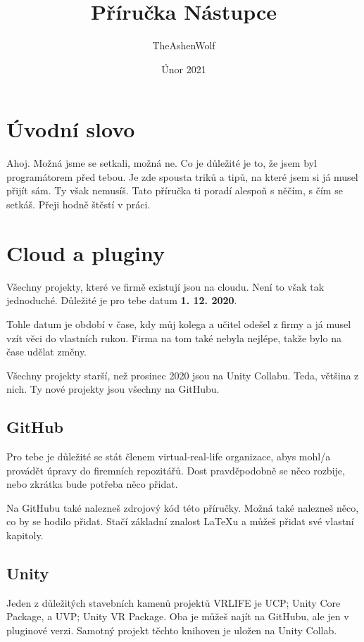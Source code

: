 \documentclass{article}
\title{Příručka Nástupce}
\author{TheAshenWolf}
\date{Únor 2021}
\begin{document}
\maketitle

\pagebreak

\renewcommand{\contentsname}{Obsah}
\tableofcontents

\pagebreak

\section{Úvodní slovo}
Ahoj. Možná jsme se setkali, možná ne. Co je důležité je to, že jsem byl programátorem před tebou. Je zde spousta triků a tipů, na které jsem si já musel přijít sám. Ty však nemusíš. Tato příručka ti poradí alespoň s něčím, s čím se setkáš. Přeji hodně štěstí v práci.
\pagebreak

\section{Cloud a pluginy}
Všechny projekty, které ve firmě existují jsou na cloudu. Není to však tak jednoduché. Důležité je pro tebe datum \textbf{1. 12. 2020}. 

Tohle datum je období v čase, kdy můj kolega a učitel odešel z firmy a já musel vzít věci do vlastních rukou. Firma na tom také nebyla nejlépe, takže bylo na čase udělat změny.

Všechny projekty starší, než prosinec 2020 jsou na Unity Collabu. Teda, většina z nich. Ty nové projekty jsou všechny na GitHubu. 

\subsection{GitHub}
Pro tebe je důležité se stát členem virtual-real-life organizace, abys mohl/a provádět úpravy do firemních repozitářů. Dost pravděpodobně se něco rozbije, nebo zkrátka bude potřeba něco přidat.

Na GitHubu také nalezneš zdrojový kód této příručky. Možná také nalezneš něco, co by se hodilo přidat.
Stačí základní znalost LaTeXu a můžeš přidat své vlastní kapitoly.

\subsection{Unity}
Jeden z důležitých stavebních kamenů projektů VRLIFE je UCP; Unity Core Package, a UVP; Unity VR Package. Oba je můžeš najít na GitHubu, ale jen v pluginové verzi. Samotný projekt těchto knihoven je uložen na Unity Collab.
\end{document}
